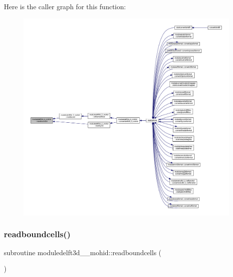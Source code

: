 Here is the caller graph for this function\+:\nopagebreak
\begin{figure}[H]
\begin{center}
\leavevmode
\includegraphics[width=350pt]{namespacemoduledelft3d__2__mohid_aae94fb67ed2e5ba83ca3fe0d12490cd4_icgraph}
\end{center}
\end{figure}
\mbox{\label{namespacemoduledelft3d__2__mohid_abd4423475ad3b1f766d3bfe7af38a4ae}} 
\subsubsection{\texorpdfstring{readboundcells()}{readboundcells()}}
{\footnotesize\ttfamily subroutine moduledelft3d\+\_\+\_\+mohid\+::readboundcells (\begin{DoxyParamCaption}{ }\end{DoxyParamCaption})\hspace{0.3cm}{\ttfamily [private]}}

